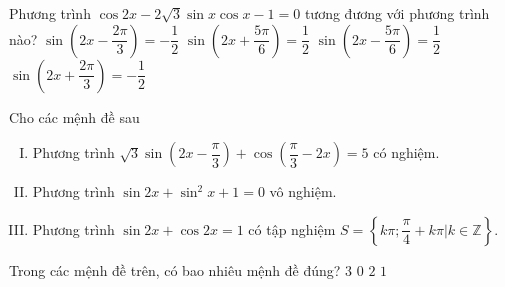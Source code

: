 \begin{ex}%
Phương trình $\cos 2x-2\sqrt{3}\sin x\cos x-1=0$ tương đương với phương trình nào?
\choice
{$\sin \left(2x-\dfrac{2\pi}{3}\right)=-\dfrac{1}{2}$}
{\True $\sin \left(2x+\dfrac{5\pi}{6}\right)=\dfrac{1}{2}$}
{$\sin \left(2x-\dfrac{5\pi}{6}\right)=\dfrac{1}{2}$}
{$\sin \left(2x+\dfrac{2\pi}{3}\right)=-\dfrac{1}{2}$}
\end{ex}

\begin{ex}%
Cho các mệnh đề sau
\begin{enumerate}[(I)]
\item Phương trình $\sqrt{3}\sin \left(2x-\dfrac{\pi}{3}\right)+\cos \left(\dfrac{\pi}{3}-2x\right)=5$ có nghiệm.
\item Phương trình $\sin 2x+\sin^2 x+1=0$ vô nghiệm.
\item Phương trình $\sin 2x+\cos 2x=1$ có tập nghiệm $S=\left\{k\pi ;\dfrac{\pi}{4}+k\pi | k\in \mathbb{Z}\right\}$.
\end{enumerate}
Trong các mệnh đề trên, có bao nhiêu mệnh đề đúng?
\choice
{$3$}
{$0$}
{\True $2$}
{$1$}
\end{ex}

